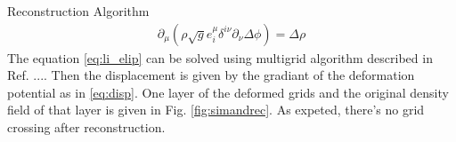 \begin{section}{Reconstruction Algorithm}
\begin{align}
 \label{eq:li_elip}
    \partial _\mu (\rho \sqrt{g} e^\mu _i \delta^{i\nu}\partial_\nu \Delta \phi)=\Delta \rho
\end{align}
The equation \ref{eq:li_elip} can be solved using multigrid algorithm described in Ref. .... Then the displacement is given by the gradiant of the deformation potential as in \ref{eq:disp}. One layer of the deformed grids and the original density field of that layer is given in Fig. \ref{fig:simandrec}. As expeted, there's no grid crossing after reconstruction.
%
\end{section}

